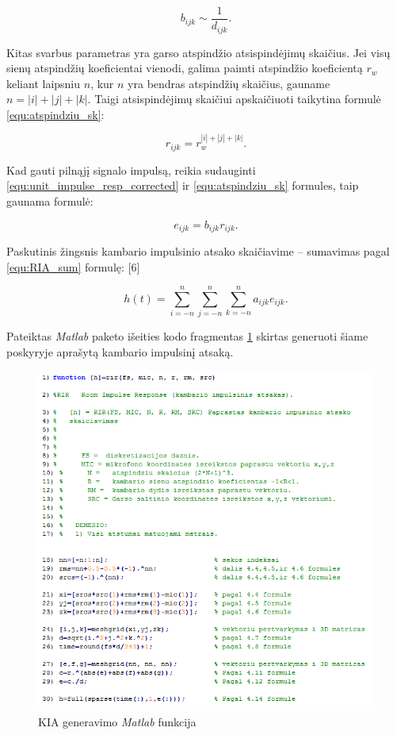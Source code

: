 \documentclass[]{vgtuef}
\begin{document}
\begin{equation}
b_{ijk}	\sim\frac{1}{d_{ijk}}
\label{equ:unit_impulse_resp_corrected}.
\end{equation}

Kitas svarbus parametras yra garso atspindžio atsispindėjimų skaičius. Jei visų sienų atspindžių koeficientai vienodi, galima paimti atspindžio koeficientą $r_{w}$ keliant laipsniu $n$, kur $n$ yra bendras atspindžių skaičius, gauname $n=|i|+|j|+|k|$. Taigi atsispindėjimų skaičiui apskaičiuoti taikytina formulė \ref{equ:atspindziu_sk}:

\begin{equation}
r_{ijk}	= r_{w}^{|i|+|j|+|k|}.
\label{equ:atspindziu_sk}
\end{equation}

Kad gauti pilnąjį signalo impulsą, reikia sudauginti \ref{equ:unit_impulse_resp_corrected} ir \ref{equ:atspindziu_sk} formules, taip gaunama formulė:

\begin{equation}
e_{ijk}	= b_{ijk} r_{ijk}.
\label{equ:full_impulse}
\end{equation}

Paskutinis žingsnis kambario impulsinio atsako skaičiavime -- sumavimas pagal \ref{equ:RIA_sum} formulę: [6]

\begin{equation}
h(t) = \sum_{i=-n}^{n}\sum_{j=-n}^{n}\sum_{k=-n}^{n} a_{ijk} e_{ijk}.
\label{equ:RIA_sum}
\end{equation}

Pateiktas \textit{Matlab} paketo išeities kodo fragmentas \ref{code:RIA_gen} skirtas generuoti šiame poskyryje aprašytą kambario impulsinį atsaką.


\begin{figure}[!h]
  \centering
  \includegraphics[width=500px]{img/KIA.png}
  \caption{KIA generavimo \textit{Matlab} funkcija}
  \label{code:RIA_gen}
\end{figure}
\end{document}
